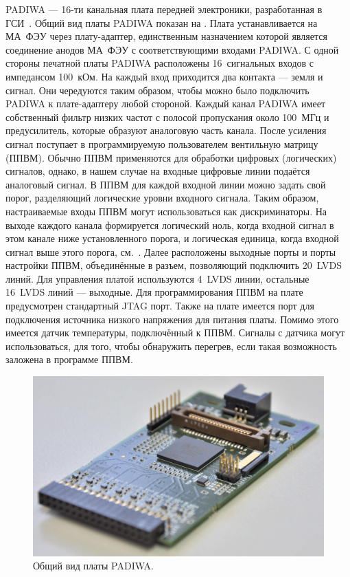 PADIWA --- 16-ти канальная плата передней электроники, разработанная в ГСИ~\cite{TRBSITE}. Общий вид платы PADIWA показан на . Плата устанавливается на МА~ФЭУ через плату-адаптер, единственным назначением которой является соединение анодов МА~ФЭУ с соответствующими входами PADIWA. С одной стороны печатной платы PADIWA расположены 16~сигнальных входов с импедансом 100~кОм. На каждый вход приходится два контакта --- земля и сигнал. Они чередуются таким образом, чтобы можно было подключить PADIWA к плате-адаптеру любой стороной. Каждый канал PADIWA имеет собственный фильтр низких частот с полосой пропускания около 100~МГц и предусилитель, которые образуют аналоговую часть канала. После усиления сигнал поступает в программируемую пользователем вентильную матрицу (ППВМ). Обычно ППВМ применяются для обработки цифровых (логических) сигналов, однако, в нашем случае на входные цифровые линии подаётся аналоговый сигнал. В ППВМ для каждой входной линии можно задать свой порог, разделяющий логические уровни входного сигнала. Таким образом, настраиваемые входы ППВМ могут использоваться как дискриминаторы. На выходе каждого канала формируется логический ноль, когда входной сигнал в этом канале ниже установленного порога, и логическая единица, когда входной сигнал выше этого порога, см.~. Далее расположены выходные порты и порты настройки ППВМ, объединённые в разъем, позволяющий подключить 20~LVDS линий. Для управления платой используются 4~LVDS линии, остальные 16~LVDS линий --- выходные. Для программирования ППВМ на плате предусмотрен стандартный JTAG порт. Также на плате имеется порт для подключения источника низкого напряжения для питания платы. Помимо этого имеется датчик температуры, подключённый к ППВМ. Сигналы с датчика могут использоваться, для того, чтобы обнаружить перегрев, если такая возможность заложена в программе ППВМ.

\begin{figure}
\includegraphics[width=1.0\textwidth]{pictures/5_padiwa_lowres.jpg}
\caption{Общий вид платы PADIWA.}
\label{fig:PADIWA}
\end{figure}

